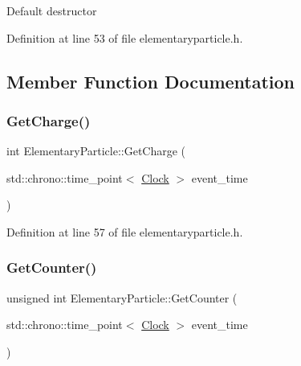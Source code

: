 Default destructor 

Definition at line 53 of file elementaryparticle.\+h.



\subsection{Member Function Documentation}
\mbox{\label{class_elementary_particle_af3ebb984cfe957b2e76463c22e4b5bb5}} 
\subsubsection{\texorpdfstring{Get\+Charge()}{GetCharge()}}
{\footnotesize\ttfamily int Elementary\+Particle\+::\+Get\+Charge (\begin{DoxyParamCaption}\item[{std\+::chrono\+::time\+\_\+point$<$ \mbox{\hyperlink{universe_8h_a0ef8d951d1ca5ab3cfaf7ab4c7a6fd80}{Clock}} $>$}]{event\+\_\+time }\end{DoxyParamCaption})\hspace{0.3cm}{\ttfamily [inline]}}



Definition at line 57 of file elementaryparticle.\+h.

\mbox{\label{class_elementary_particle_a371b9b9bc520047c42d9e6d06b7f3dd9}} 
\subsubsection{\texorpdfstring{Get\+Counter()}{GetCounter()}}
{\footnotesize\ttfamily unsigned int Elementary\+Particle\+::\+Get\+Counter (\begin{DoxyParamCaption}\item[{std\+::chrono\+::time\+\_\+point$<$ \mbox{\hyperlink{universe_8h_a0ef8d951d1ca5ab3cfaf7ab4c7a6fd80}{Clock}} $>$}]{event\+\_\+time }\end{DoxyParamCaption})\hspace{0.3cm}{\ttfamily [inline]}}



